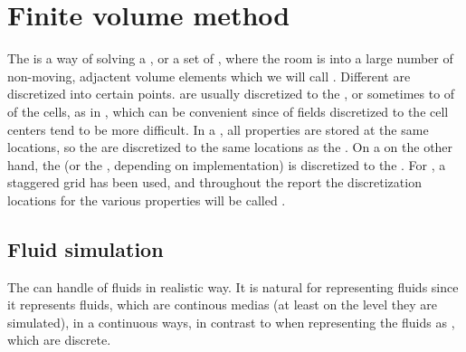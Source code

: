 \chapter{Finite volume method}



The \FVM is a way of solving a \PDE, or a set of \PDEs, where the room is \discretized into a large number of non-moving, adjactent volume elements which we will call \cells. Different \properties are discretized into certain points.  are usually discretized to the , or sometimes to  of  of the cells, as in \citep{Losasso2004}, which can be convenient since \interpolation of fields discretized to the cell centers tend to be more difficult. In a , all properties are stored at the same locations, so the  are discretized to the same locations as the . On a  on the other hand, the \velocity (or the \momentum, depending on implementation) is discretized to the . For \thisprojectwork, a staggered grid has been used, and throughout the report the discretization locations for the various properties will be called .

\section{Fluid simulation}

The \FVM can handle \simulation of fluids in realistic way. It is natural for representing fluids since it represents fluids, which are continous medias (at least on the level they are simulated), in a continuous ways, in contrast to when representing the fluids as , which are discrete.

